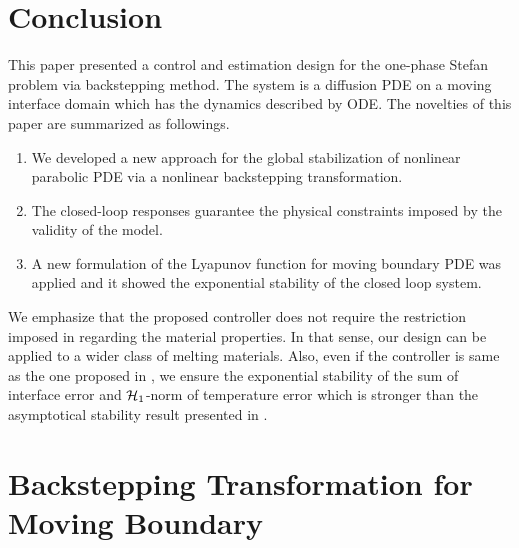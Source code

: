 \documentclass[journal]{IEEEtran}
\begin{document}
\section{Conclusion}\label{sec:conclusion}
This paper presented a control and estimation design for the one-phase Stefan problem via backstepping method. The system is a diffusion PDE on a moving interface domain which has the dynamics described by ODE. The novelties of this paper are summarized as followings. 
\begin{enumerate}
\item We developed a new approach for the global stabilization of nonlinear parabolic PDE via a nonlinear backstepping transformation. 
\item The closed-loop responses guarantee the physical constraints imposed by the validity of the model. 
\item A new formulation of the Lyapunov function for moving boundary PDE was applied and it showed the exponential stability of the closed loop system. 
\end{enumerate}
We emphasize that the proposed controller does not require the restriction imposed in \cite{maidi2014}  regarding the material properties. In that sense, our design can be applied to a wider  class of melting materials. Also, even if  the controller is same as the one proposed in  \cite{petrus10}, we ensure  the exponential stability of the sum of interface error and ${\cal H}_1$-norm of temperature error which is stronger than the  asymptotical stability result presented in \cite{petrus10}. 

\appendices
\section{Backstepping Transformation for Moving Boundary}\label{appA}
\end{document}
